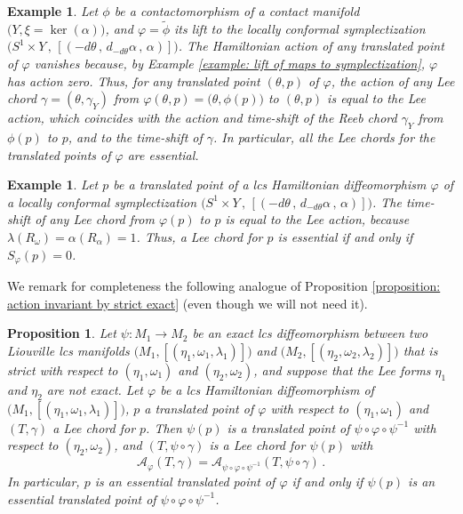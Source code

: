 \documentclass{amsart}
\newtheorem{prop}[thm]{Proposition}
\newtheorem{example}[thm]{Example}
\theoremstyle{remark}
\begin{document}
\begin{example}
Let $\phi$ be a contactomorphism
of a contact manifold $\big(Y, \xi = \ker (\alpha)\big)$,
and $\varphi = \widetilde{\phi}$ its lift
to the locally conformal symplectization
$\big( S^1 \times Y \,,\, [( -d\theta \,,\, d_{-d\theta}\alpha \,,\, \alpha )] \big)$.
The Hamiltonian action of any translated point of ${\varphi}$ vanishes
because, by Example \ref{example: lift of maps to symplectization},
${\varphi}$ has action zero.
Thus,
for any translated point $(\theta, p)$ of ${\varphi}$,
the action of any Lee chord $\gamma = (\theta, \gamma_Y)$
from ${\varphi} (\theta, p) = \big(\theta, \phi(p)\big)$ to $(\theta, p)$
is equal to the Lee action,
which coincides with the action and time-shift
of the Reeb chord $\gamma_Y$ from $\phi(p)$ to $p$,
and to the time-shift of $\gamma$.
In particular,
all the Lee chords for the translated points of $\varphi$
are essential.
\end{example}

\begin{example}\label{example: action translated point in conformal symplectization}
Let $p$ be a translated point
of a lcs Hamiltonian diffeomorphism $\varphi$
of a locally conformal symplectization
$\big( S^1 \times Y \,,\, [( -d\theta \,,\, d_{-d\theta}\alpha \,,\, \alpha )] \big)$.
The time-shift of any Lee chord
from $\varphi(p)$ to $p$
is equal to the Lee action,
because $\lambda (R_{\omega}) = \alpha (R_{\alpha}) = 1$.
Thus, a Lee chord for $p$ is essential
if and only if $S_{\varphi} (p) = 0$.
\end{example}

We remark for completeness the following analogue
of Proposition \ref{proposition: action invariant by strict exact}
(even though we will not need it).

\begin{prop}\label{proposition: action invariant by conjugaiton by strict exact}
Let $\psi: M_1 \rightarrow M_2$ be an exact lcs diffeomorphism
between two Liouville lcs manifolds
$\big( M_1, [(\eta_1, \omega_1, \lambda_1)] \big)$
and $\big( M_2, [(\eta_2, \omega_2, \lambda_2)] \big)$
that is strict with respect to
$(\eta_1, \omega_1)$ and $(\eta_2, \omega_2)$,
and suppose that the Lee forms $\eta_1$ and $\eta_2$
are not exact.
Let $\varphi$ be a lcs Hamiltonian diffeomorphism
of $\big( M_1, [(\eta_1, \omega_1, \lambda_1)] \big)$,
$p$ a translated point of $\varphi$ with respect to $(\eta_1, \omega_1)$
and $(T, \gamma)$ a Lee chord for $p$.
Then $\psi(p)$ is a translated point of $\psi \circ \varphi \circ \psi^{-1}$
with respect to $(\eta_2, \omega_2)$,
and $(T, \psi \circ \gamma)$ is a Lee chord for $\psi(p)$
with
$$
\mathcal{A}_{\varphi} (T, \gamma)
= \mathcal{A}_{\psi \circ \varphi \circ \psi^{-1}} (T, \psi \circ \gamma) \,.
$$
In particular,
$p$ is an essential translated point of $\varphi$
if and only if $\psi (p)$ is an essential translated point
of $\psi \circ \varphi \circ \psi^{-1}$.
\end{prop}
\end{document}
